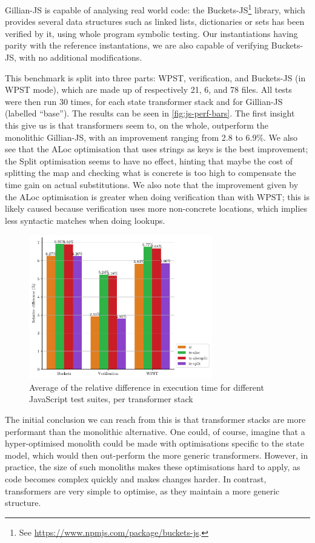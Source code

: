 Gillian-JS is capable of analysing real world code: the Buckets-JS\footnote{See \url{https://www.npmjs.com/package/buckets-js}.} library, which provides several data structures such as linked lists, dictionaries or sets has been verified by it, using whole program symbolic testing. Our instantiations having parity with the reference instantations, we are also capable of verifying Buckets-JS, with no additional modifications.

This benchmark is split into three parts: WPST, verification, and Buckets-JS (in WPST mode), which are made up of respectively 21, 6, and 78 files. All tests were then run 30 times, for each state transformer stack and for Gillian-JS (labelled ``base''). The results can be seen in \autoref{fig:js-perf-bars}. The first insight this give us is that transformers seem to, on the whole, outperform the monolithic Gillian-JS, with an improvement ranging from 2.8 to 6.9\%. We also see that the ALoc optimisation that uses strings as keys is the best improvement; the Split optimisation seems to have no effect, hinting that maybe the cost of splitting the map and checking what is concrete is too high to compensate the time gain on actual substitutions. We also note that the improvement given by the ALoc optimisation is greater when doing verification than with WPST; this is likely caused because verification uses more non-concrete locations, which implies less syntactic matches when doing lookups.

\begin{figure}
	\centering
	\includegraphics[width=8cm]{figures/js/avg_mode_relative_diff}
	\caption{Average of the relative difference in execution time for different JavaScript test suites, per transformer stack}
	\label{fig:js-perf-bars}
\end{figure}

The initial conclusion we can reach from this is that transformer stacks are  more performant than the monolithic alternative. One could, of course, imagine that a hyper-optimised monolith could be made with optimisations specific to the state model, which would then out-perform the more generic transformers. However, in practice, the size of such monoliths makes these optimisations hard to apply, as code becomes complex quickly and makes changes harder. In contrast, transformers are very simple to optimise, as they maintain a more generic structure.

